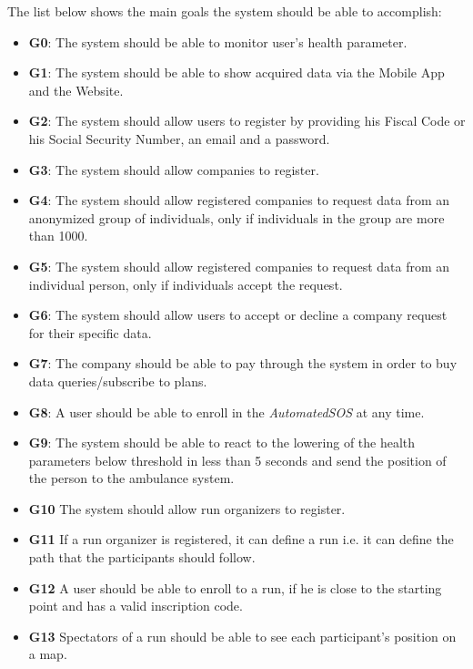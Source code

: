The list below shows the main goals the system should be able to accomplish:

\begin{itemize}
    \item \textbf{G0}: The system should be able to monitor user's health parameter.
    \item \textbf{G1}: The system should be able to show acquired data via the Mobile App and the Website.
    \item \textbf{G2}: The system should allow users to register by providing his Fiscal Code or his Social Security Number, an email and a password.
    \item \textbf{G3}: The system should allow companies to register.
    \item \textbf{G4}: The system should allow registered companies to request data from an anonymized group of individuals, only if individuals in the group are more than 1000.
    \item \textbf{G5}: The system should allow registered companies to request data from an individual person, only if individuals accept the request.
    \item \textbf{G6}: The system should allow users to accept or decline a company request for their specific data.
    \item \textbf{G7}: The company should be able to pay through the system in order to buy data queries/subscribe to plans.

    \item \textbf{G8}: A user should be able to enroll in the \textit{AutomatedSOS} at any time.
    \item \textbf{G9}: The system should be able to react to the lowering of the health parameters below threshold in less than 5 seconds and send the position of the person to the ambulance system. 
    
    \item \textbf{G10} The system should allow run organizers to register.
    \item \textbf{G11} If a run organizer is registered, it can define a run i.e. it can define the path that the participants should follow.
    \item \textbf{G12} A user should be able to enroll to a run, if he is close to the starting point and has a valid inscription code.
    \item \textbf{G13} Spectators of a run should be able to see each participant's position on a map.
\end{itemize}





